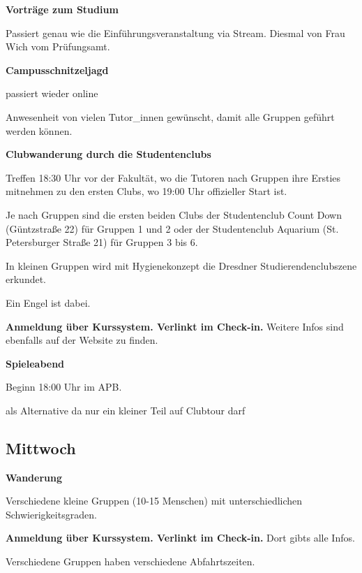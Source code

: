 \documentclass[a4paper,12pt]{scrreprt}
\begin{document}
\textbf{Vorträge zum Studium}
\begin{itemize*}
    \item Passiert genau wie die Einführungsveranstaltung via Stream. Diesmal von Frau Wich vom Prüfungsamt.
\end{itemize*}

\textbf{Campusschnitzeljagd}
\begin{itemize*}
    \item passiert wieder online
    \item Anwesenheit von vielen Tutor\_innen gewünscht, damit alle Gruppen geführt werden können.
\end{itemize*}

\textbf{Clubwanderung durch die Studentenclubs}
\begin{itemize*}
    \item Treffen 18:30 Uhr vor der Fakultät, wo die Tutoren nach Gruppen ihre Ersties mitnehmen zu den ersten Clubs, wo 19:00 Uhr offizieller Start ist.
    \item Je nach Gruppen sind die ersten beiden Clubs der Studentenclub Count Down (Güntzstraße 22) für Gruppen 1 und 2 oder der Studentenclub Aquarium (St. Petersburger Straße 21) für Gruppen 3 bis 6. 
    \item In kleinen Gruppen wird mit Hygienekonzept die Dresdner Studierendenclubszene erkundet.
    \item Ein Engel ist dabei.
    \item \textbf{Anmeldung über Kurssystem. Verlinkt im Check-in.} Weitere Infos sind ebenfalls auf der Website zu finden. 
\end{itemize*}

\textbf{Spieleabend}
\begin{itemize*}
    \item Beginn 18:00 Uhr im APB.
    \item als Alternative da nur ein kleiner Teil auf Clubtour darf
\end{itemize*}

\subsection{Mittwoch}

\textbf{Wanderung}
\begin{itemize*}
    \item Verschiedene kleine Gruppen (10-15 Menschen) mit unterschiedlichen Schwierigkeitsgraden.
    \item \textbf{Anmeldung über Kurssystem. Verlinkt im Check-in.} Dort gibts alle Infos.
    \item Verschiedene Gruppen haben verschiedene Abfahrtszeiten.
\end{itemize*}
\end{document}
